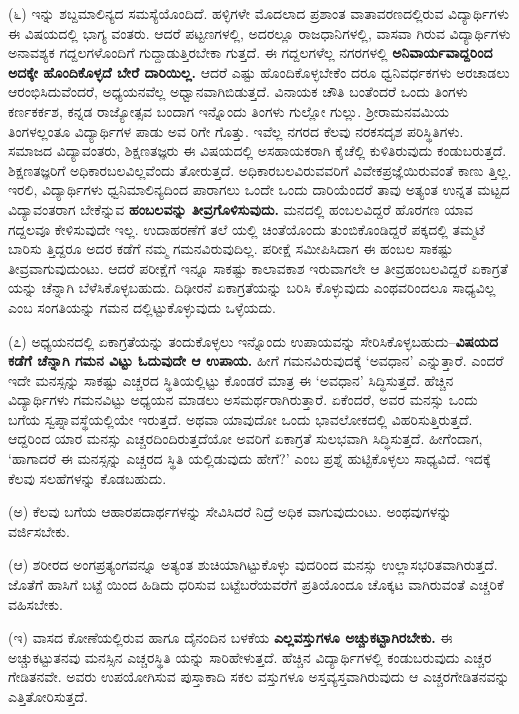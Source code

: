(೬) ಇನ್ನು ಶಬ್ದಮಾಲಿನ್ಯದ ಸಮಸ್ಯೆಯೊಂದಿದೆ. ಹಳ್ಳಿಗಳೇ ಮೊದಲಾದ ಪ್ರಶಾಂತ ವಾತಾವರಣದಲ್ಲಿರುವ ವಿದ್ಯಾರ್ಥಿಗಳು ಈ ವಿಷಯದಲ್ಲಿ ಭಾಗ್ಯ ವಂತರು. ಆದರೆ ಪಟ್ಟಣಗಳಲ್ಲಿ, ಅದರಲ್ಲೂ ರಾಜಧಾನಿಗಳಲ್ಲಿ, ವಾಸವಾ ಗಿರುವ ವಿದ್ಯಾರ್ಥಿಗಳು ಅನಾವಶ್ಯಕ ಗದ್ದಲಗಳೊಂದಿಗೆ ಗುದ್ದಾಡುತ್ತಿರಬೇಕಾ ಗುತ್ತದೆ. ಈ ಗದ್ದಲಗಳೆಲ್ಲ ನಗರಗಳಲ್ಲಿ \textbf{ಅನಿವಾರ್ಯವಾದ್ದರಿಂದ ಅದಕ್ಕೇ ಹೊಂದಿಕೊಳ್ಳದೆ ಬೇರೆ ದಾರಿಯಿಲ್ಲ.} ಆದರೆ ಎಷ್ಟು ಹೊಂದಿಕೊಳ್ಳಬೇಕೆಂ ದರೂ ಧ್ವನಿವರ್ಧಕಗಳು ಅರಚಾಡಲು ಆರಂಭಿಸಿದುವೆಂದರೆ, ಅಧ್ಯಯನವೆಲ್ಲ ಅಧ್ವಾನವಾಗಿಬಿಡುತ್ತದೆ. ವಿನಾಯಕ ಚೌತಿ ಬಂತೆಂದರೆ ಒಂದು ತಿಂಗಳು ಕರ್ಣಕರ್ಕಶ, ಕನ್ನಡ ರಾಜ್ಯೋತ್ಸವ ಬಂದಾಗ ಇನ್ನೊಂದು ತಿಂಗಳು ಗುಲ್ಲೋ ಗುಲ್ಲು. ಶ್ರೀರಾಮನವಮಿಯ ತಿಂಗಳಲ್ಲಂತೂ ವಿದ್ಯಾರ್ಥಿಗಳ ಪಾಡು ಅವ ರಿಗೇ ಗೊತ್ತು. ಇವೆಲ್ಲ ನಗರದ ಕೆಲವು ನರಕಸದೃಶ ಪರಿಸ್ಥಿತಿಗಳು. ಸಮಾಜದ ವಿದ್ಯಾವಂತರು, ಶಿಕ್ಷಣತಜ್ಞರು ಈ ವಿಷಯದಲ್ಲಿ ಅಸಹಾಯಕರಾಗಿ ಕೈಚೆಲ್ಲಿ ಕುಳಿತಿರುವುದು ಕಂಡುಬರುತ್ತದೆ. ಶಿಕ್ಷಣತಜ್ಞರಿಗೆ ಅಧಿಕಾರಬಲವಿಲ್ಲವೆಂದು ತೋರುತ್ತದೆ. ಅಧಿಕಾರಬಲವಿರುವವರಿಗೆ ವಿವೇಕಪ್ರಜ್ಞೆಯಿರುವಂತೆ ಕಾಣು ತ್ತಿಲ್ಲ. ಇರಲಿ, ವಿದ್ಯಾರ್ಥಿಗಳು ಧ್ವನಿಮಾಲಿನ್ಯದಿಂದ ಪಾರಾಗಲು ಒಂದೇ ಒಂದು ದಾರಿಯೆಂದರೆ ತಾವು ಅತ್ಯಂತ ಉನ್ನತ ಮಟ್ಟದ ವಿದ್ಯಾವಂತರಾಗ ಬೇಕೆನ್ನುವ \textbf{ಹಂಬಲವನ್ನು ತೀವ್ರಗೊಳಿಸುವುದು.} ಮನದಲ್ಲಿ ಹಂಬಲವಿದ್ದರೆ ಹೊರಗಣ ಯಾವ ಗದ್ದಲವೂ ಕೇಳಿಸುವುದೇ ಇಲ್ಲ. ಉದಾಹರಣೆಗೆ ತಲೆ ಯಲ್ಲಿ ಚಿಂತೆಯೊಂದು ತುಂಬಿಕೊಂಡಿದ್ದರೆ ಪಕ್ಕದಲ್ಲಿ ತಮ್ಮಟೆ ಬಾರಿಸು ತ್ತಿದ್ದರೂ ಅದರ ಕಡೆಗೆ ನಮ್ಮ ಗಮನವಿರುವುದಿಲ್ಲ. ಪರೀಕ್ಷೆ ಸಮೀಪಿಸಿದಾಗ ಈ ಹಂಬಲ ಸಾಕಷ್ಟು ತೀವ್ರವಾಗುವುದುಂಟು. ಆದರೆ ಪರೀಕ್ಷೆಗೆ ಇನ್ನೂ ಸಾಕಷ್ಟು ಕಾಲಾವಕಾಶ ಇರುವಾಗಲೇ ಆ ತೀವ್ರಹಂಬಲವಿದ್ದರೆ ಏಕಾಗ್ರತೆ ಯನ್ನು ಚೆನ್ನಾಗಿ ಬೆಳೆಸಿಕೊಳ್ಳಬಹುದು. ದಿಢೀರನೆ ಏಕಾಗ್ರತೆಯನ್ನು ಬರಿಸಿ ಕೊಳ್ಳುವುದು ಎಂಥವರಿಂದಲೂ ಸಾಧ್ಯವಿಲ್ಲ ಎಂಬ ಸಂಗತಿಯನ್ನು ಗಮನ ದಲ್ಲಿಟ್ಟುಕೊಳ್ಳುವುದು ಒಳ್ಳೆಯದು.

(೭) ಅಧ್ಯಯನದಲ್ಲಿ ಏಕಾಗ್ರತೆಯನ್ನು ತಂದುಕೊಳ್ಳಲು ಇನ್ನೊಂದು ಉಪಾಯವನ್ನು ಸೇರಿಸಿಕೊಳ್ಳಬಹುದು–\textbf{ವಿಷಯದ ಕಡೆಗೆ ಚೆನ್ನಾಗಿ ಗಮನ ವಿಟ್ಟು ಓದುವುದೇ ಆ ಉಪಾಯ.} ಹೀಗೆ ಗಮನವಿರುವುದಕ್ಕೆ ‘ಅವಧಾನ’ ಎನ್ನುತ್ತಾರೆ. ಎಂದರೆ ಇದೇ ಮನಸ್ಸನ್ನು ಸಾಕಷ್ಟು ಎಚ್ಚರದ ಸ್ಥಿತಿಯಲ್ಲಿಟ್ಟು ಕೊಂಡರೆ ಮಾತ್ರ ಈ ‘ಅವಧಾನ’ ಸಿದ್ಧಿಸುತ್ತದೆ. ಹೆಚ್ಚಿನ ವಿದ್ಯಾರ್ಥಿಗಳು ಗಮನವಿಟ್ಟು ಅಧ್ಯಯನ ಮಾಡಲು ಅಸಮರ್ಥರಾಗಿರುತ್ತಾರೆ. ಏಕೆಂದರೆ, ಅವರ ಮನಸ್ಸು ಒಂದು ಬಗೆಯ ಸ್ವಪ್ನಾವಸ್ಥೆಯಲ್ಲಿಯೇ ಇರುತ್ತದೆ. ಅಥವಾ ಯಾವುದೋ ಒಂದು ಭಾವಲೋಕದಲ್ಲಿ ವಿಹರಿಸುತ್ತಿರುತ್ತದೆ. ಆದ್ದರಿಂದ ಯಾರ ಮನಸ್ಸು ಎಚ್ಚರದಿಂದಿರುತ್ತದೆಯೋ ಅವರಿಗೆ ಏಕಾಗ್ರತೆ ಸುಲಭವಾಗಿ ಸಿದ್ಧಿಸುತ್ತದೆ. ಹೀಗೆಂದಾಗ, ‘ಹಾಗಾದರೆ ಈ ಮನಸ್ಸನ್ನು ಎಚ್ಚರದ ಸ್ಥಿತಿ ಯಲ್ಲಿಡುವುದು ಹೇಗೆ?’ ಎಂಬ ಪ್ರಶ್ನೆ ಹುಟ್ಟಿಕೊಳ್ಳಲು ಸಾಧ್ಯವಿದೆ. ಇದಕ್ಕೆ ಕೆಲವು ಸಲಹೆಗಳನ್ನು ಕೊಡಬಹುದು.

(ಅ) ಕೆಲವು ಬಗೆಯ ಆಹಾರಪದಾರ್ಥಗಳನ್ನು ಸೇವಿಸಿದರೆ ನಿದ್ರೆ ಅಧಿಕ ವಾಗುವುದುಂಟು. ಅಂಥವುಗಳನ್ನು ವರ್ಜಿಸಬೇಕು.

(ಆ) ಶರೀರದ ಅಂಗಪ್ರತ್ಯಂಗವನ್ನೂ ಅತ್ಯಂತ ಶುಚಿಯಾಗಿಟ್ಟುಕೊಳ್ಳು ವುದರಿಂದ ಮನಸ್ಸು ಉಲ್ಲಾಸಭರಿತವಾಗಿರುತ್ತದೆ. ಜೊತೆಗೆ ಹಾಸಿಗೆ ಬಟ್ಟೆ ಯಿಂದ ಹಿಡಿದು ಧರಿಸುವ ಬಟ್ಟೆಬರೆಯವರೆಗೆ ಪ್ರತಿಯೊಂದೂ ಚೊಕ್ಕಟ ವಾಗಿರುವಂತೆ ಎಚ್ಚರಿಕೆ ವಹಿಸಬೇಕು.

(ಇ) ವಾಸದ ಕೋಣೆಯಲ್ಲಿರುವ ಹಾಗೂ ದೈನಂದಿನ ಬಳಕೆಯ \textbf{ಎಲ್ಲವಸ್ತುಗಳೂ ಅಚ್ಚುಕಟ್ಟಾಗಿರಬೇಕು.} ಈ ಅಚ್ಚುಕಟ್ಟುತನವು ಮನಸ್ಸಿನ ಎಚ್ಚರಸ್ಥಿತಿ ಯನ್ನು ಸಾರಿಹೇಳುತ್ತದೆ. ಹೆಚ್ಚಿನ ವಿದ್ಯಾರ್ಥಿಗಳಲ್ಲಿ ಕಂಡುಬರುವುದು ಎಚ್ಚರ ಗೇಡಿತನವೇ. ಅವರು ಉಪಯೋಗಿಸುವ ಪುಸ್ತಾಕಾದಿ ಸಕಲ ವಸ್ತುಗಳೂ ಅಸ್ತವ್ಯಸ್ತವಾಗಿರುವುದು ಆ ಎಚ್ಚರಗೇಡಿತನವನ್ನು ಎತ್ತಿತೋರಿಸುತ್ತದೆ.

